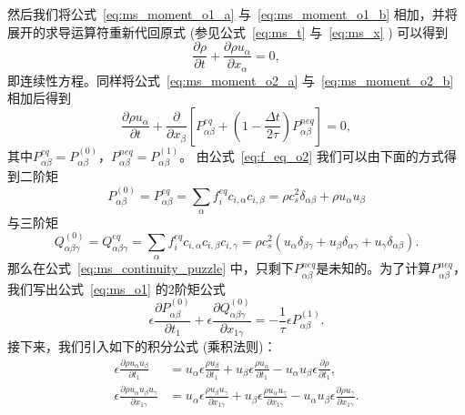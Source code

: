 然后我们将公式~\ref{eq:ms_moment_o1_a} 与~\ref{eq:ms_moment_o1_b} 相加，并将展开的求导运算符重新代回原式 (参见公式~\ref{eq:ms_t} 与~\ref{eq:ms_x} ) 可以得到
\begin{equation}
\frac{\partial \rho}{\partial t}+\frac{\partial \rho u_{\alpha}}{\partial x_{\alpha}}=0,
\end{equation}
即连续性方程。同样将公式~\ref{eq:ms_moment_o2_a} 与~\ref{eq:ms_moment_o2_b} 相加后得到
\begin{equation}
\frac{\partial \rho u_{\alpha}}{\partial t}+\frac{\partial}{\partial x_{\beta}}\left[P_{\alpha \beta}^{e q}+\left(1-\frac{\Delta t}{2 \tau}\right) P_{\alpha \beta}^{n e q}\right]=0,
\label{eq:ms_continuity_puzzle}
\end{equation}
其中$P_{\alpha \beta}^{e q}=P_{\alpha \beta}^{(0)}$，$P_{\alpha \beta}^{n e q}=P_{\alpha \beta}^{(1)}$。
由公式~\ref{eq:f_eq_o2} 我们可以由下面的方式得到二阶矩
\begin{equation}
P_{\alpha \beta}^{(0)}=P_{\alpha \beta}^{e q}=\sum_{\alpha} f_{i}^{e q} {c}_{i, \alpha} {c}_{i, \beta}=\rho c_{s}^{2}\delta_{\alpha \beta}+\rho u_{\alpha} u_{\beta}
\end{equation}
与三阶矩
\begin{equation}
Q_{\alpha \beta \gamma}^{(0)}=Q_{\alpha \beta \gamma}^{e q}=\sum_{\alpha} f_{i}^{e q} {c}_{i, \alpha} {c}_{i, \beta} {c}_{i, \gamma}=\rho c_{s}^{2}\left(u_{\alpha} \delta_{\beta \gamma}+u_{\beta} \delta_{\alpha \gamma}+u_{\gamma} \delta_{\alpha \beta}\right).
\end{equation}
那么在公式~\ref{eq:ms_continuity_puzzle} 中，只剩下$P_{\alpha \beta}^{n e q}$是未知的。为了计算$P_{\alpha \beta}^{n e q}$，我们写出公式~\ref{eq:ms_o1} 的2阶矩公式
\begin{equation}
\epsilon \frac{\partial P_{\alpha \beta}^{(0)}}{\partial t_{1}}+\epsilon \frac{\partial Q_{\alpha \beta \gamma}^{(0)}}{\partial x_{1 \gamma}}=-\frac{1}{\tau} \epsilon P_{\alpha \beta}^{(1)}.
\label{eq:ms_moment_o2}
\end{equation}
接下来，我们引入如下的积分公式 (乘积法则)：
\begin{align}
\epsilon \frac{\partial \rho u_{\alpha} u_{\beta}}{\partial t_{1}} & =u_{\alpha} \epsilon \frac{\rho u_{\beta}}{\partial t_{1}}+u_{\beta} \epsilon \frac{\rho u_{\alpha}}{\partial t_{1}}-u_{\alpha} u_{\beta} \epsilon \frac{\partial \rho}{\partial t_{1}}, \\
\epsilon \frac{\partial \rho u_{\alpha} u_{\beta} u_{\gamma}}{\partial x_{1 \gamma}} & =u_{\alpha} \epsilon \frac{\rho u_{\beta} u_{\gamma}}{\partial x_{1 \gamma}}+u_{\beta} \epsilon \frac{\rho u_{\alpha} u_{\gamma}}{\partial x_{1 \gamma}}-u_{\alpha} u_{\beta} \epsilon \frac{\partial \rho u_{\gamma}}{\partial x_{1 \gamma}} .
\end{align}
